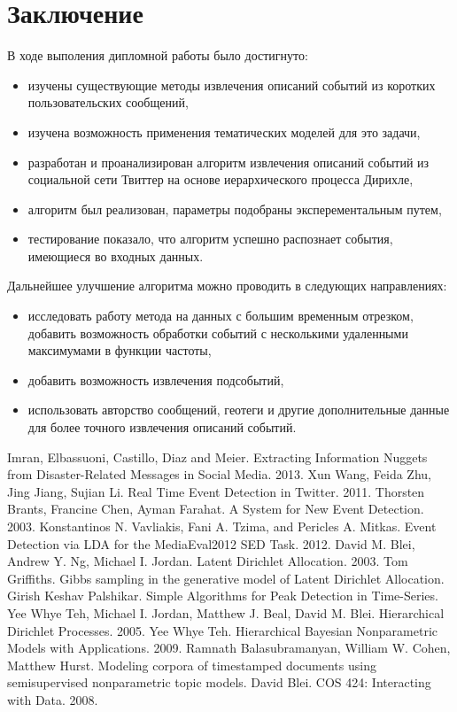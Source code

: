 \documentclass[12pt, a4paper]{article}
\begin{document}
	\section{Заключение}
	В ходе выполения дипломной работы было достигнуто:
	\begin{itemize}
	\item изучены существующие методы извлечения описаний событий из коротких пользовательских сообщений,
	\item изучена возможность применения тематических моделей для это задачи,
	\item разработан и проанализирован алгоритм извлечения описаний событий из социальной сети Твиттер на основе иерархического процесса Дирихле,
	\item алгоритм был реализован, параметры подобраны эксперементальным путем,
	\item тестирование показало, что алгоритм успешно распознает события, имеющиеся во входных данных.
	\end{itemize}
		Дальнейшее улучшение алгоритма можно проводить в следующих направлениях:
	\begin{itemize}
	\item исследовать работу метода на данных с большим временным отрезком, добавить возможность обработки событий с несколькими удаленными максимумами в функции частоты,
	\item добавить возможность извлечения подсобытий,
	\item использовать авторство сообщений, геотеги и другие дополнительные данные для более точного извлечения описаний событий.
	\end{itemize}
  
\begin{thebibliography}{9}
	Imran, Elbassuoni, Castillo, Diaz and Meier.
	Extracting Information Nuggets from Disaster-Related Messages in Social Media.
	2013.
	Xun Wang, Feida Zhu, Jing Jiang, Sujian Li.
	Real Time Event Detection in Twitter.
	2011.
	Thorsten Brants, Francine Chen, Ayman Farahat.
	A System for New Event Detection.
	2003.
	Konstantinos N. Vavliakis, Fani A. Tzima, and Pericles A. Mitkas.	
	Event Detection via LDA for the MediaEval2012 SED Task.
	2012.
	David M. Blei, Andrew Y. Ng, Michael I. Jordan.
	Latent Dirichlet Allocation.
	2003.
	Tom Griffiths.
	Gibbs sampling in the generative model of Latent Dirichlet Allocation.
	Girish Keshav Palshikar.
	Simple Algorithms for Peak Detection in Time-Series.
	Yee Whye Teh, Michael I. Jordan, Matthew J. Beal, David M. Blei.
	Hierarchical Dirichlet Processes.
	2005.
	Yee Whye Teh.
	Hierarchical Bayesian Nonparametric Models with Applications.
	2009.
	Ramnath Balasubramanyan, William W. Cohen, Matthew Hurst.
	Modeling corpora of timestamped documents using semisupervised nonparametric topic models.
	 David Blei.
	 COS 424: Interacting with Data.
	 2008.
\end{thebibliography}
  
\end{document}
